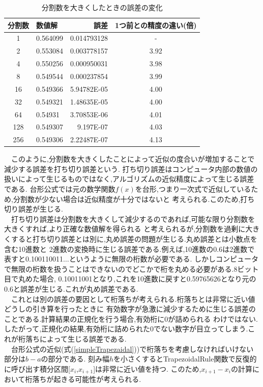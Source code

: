 \documentclass[dvipdfmx]{jarticle}
\begin{document}
      \begin{table}[H]
        \caption{分割数を大きくしたときの誤差の変化}
      \label{error1}
      \begin{center}
          \begin{tabular}{c|l|r|c}\hline
            分割数 & 数値解 & 誤差 & 1つ前との精度の違い(倍) \\ \hline \hline
            1 & 0.564099 & 0.014793128 & - \\
            2 & 0.553084 & 0.003778157 & 3.92 \\
            4 & 0.550256 & 0.000950031 & 3.98 \\
            8 & 0.549544 & 0.000237854 & 3.99 \\
            16 & 0.549366 & 5.94782E-05 & 4.00 \\
            32 & 0.549321 & 1.48635E-05 & 4.00 \\
            64 & 0.54931 & 3.70853E-06 & 4.01 \\
            128 & 0.549307 & 9.197E-07 & 4.03 \\
            256 & 0.549306 & 2.22487E-07 & 4.13 \\ \hline 
          \end{tabular}
      \end{center}
      \end{table}
      　このように,分割数を大きくしたことによって近似の度合いが増加することで減少する誤差を打ち切り誤差という.
      打ち切り誤差はコンピュータ内部の数値の扱いによって生じるものではなく,アルゴリズムの近似精度によって生じる誤差である.
      台形公式では元の数学関数$f(x)$を台形,つまり一次式で近似しているため,分割数が少ない場合は近似精度が十分ではないと
      考えられる.このため,打ち切り誤差が生じる.\\
      　打ち切り誤差は分割数を大きくして減少するのであれば,可能な限り分割数を大きくすれば,より正確な数値解を得られる
      と考えられるが,分割数を過剰に大きくすると打ち切り誤差とは別に,丸め誤差の問題が生じる.丸め誤差とは小数点を含む10進数と
      2進数の変換時に生じる誤差である.例えば,10進数の0.6は2進数で表すと0.100110011$\dots$というように無限の桁数が必要である.
      しかしコンピュータで無限の桁数を扱うことはできないのでどこかで桁を丸める必要がある.8ビット目で丸めた場合,
      0.10011001となり,これを10進数に戻すと0.59765626となり元の0.6と誤差が生じる.これが丸め誤差である.\\
      　これとは別の誤差の要因として桁落ちが考えられる.桁落ちとは非常に近い値どうしの引き算を行ったときに
      有効数字が急激に減少するために生じる誤差のことである.計算結果の正規化を行う場合,有効桁に0が詰められる
      わけではない.したがって,正規化の結果,有効桁に詰められた0でない数字が目立ってしまう.これが桁落ちによって生じる誤差である.\\
      　台形公式の近似(式(\ref{simpleTrapezaidal}))で桁落ちを考慮しなければいけない部分は$b-a$の部分である.
      刻み幅$h$を小さくするとTrapezoidalRule関数で反復的に呼び出す積分区間[$x_i$,$x_{i+1}$]は非常に近い値を持つ.
      このため,$x_{i+1}-x_i$の計算において桁落ちが起きる可能性が考えられる.
\end{document}

